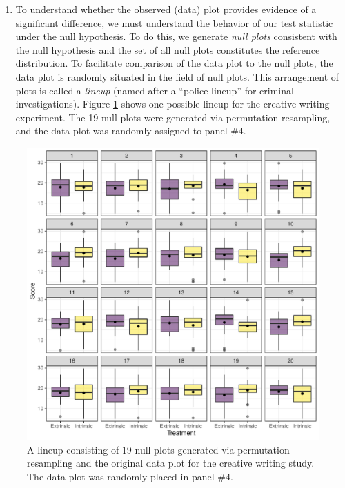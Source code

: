 \documentclass[12pt]{article}
\providecommand{\tightlist}{%
  \setlength{\itemsep}{0pt}\setlength{\parskip}{0pt}}
\begin{document}
\begin{enumerate}
\def\labelenumi{\arabic{enumi}.}
\setcounter{enumi}{2}
\tightlist
\item
  To understand whether the observed (data) plot provides evidence of a
  significant difference, we must understand the behavior of our test
  statistic under the null hypothesis. To do this, we generate
  \emph{null plots} consistent with the null hypothesis and the set of
  all null plots constitutes the reference distribution. To facilitate
  comparison of the data plot to the null plots, the data plot is
  randomly situated in the field of null plots. This arrangement of
  plots is called a \emph{lineup} (named after a ``police lineup'' for
  criminal investigations). Figure \ref{fig:lineup} shows one possible
  lineup for the creative writing experiment. The 19 null plots were
  generated via permutation resampling, and the data plot was randomly
  assigned to panel \#4.
\end{enumerate}

\begin{figure}
\centering
\includegraphics{figs/permute_lineup.pdf}
\caption{\label{fig:lineup} A lineup consisting of 19 null plots
generated via permutation resampling and the original data plot for the
creative writing study. The data plot was randomly placed in panel \#4.}
\end{figure}
\end{document}
